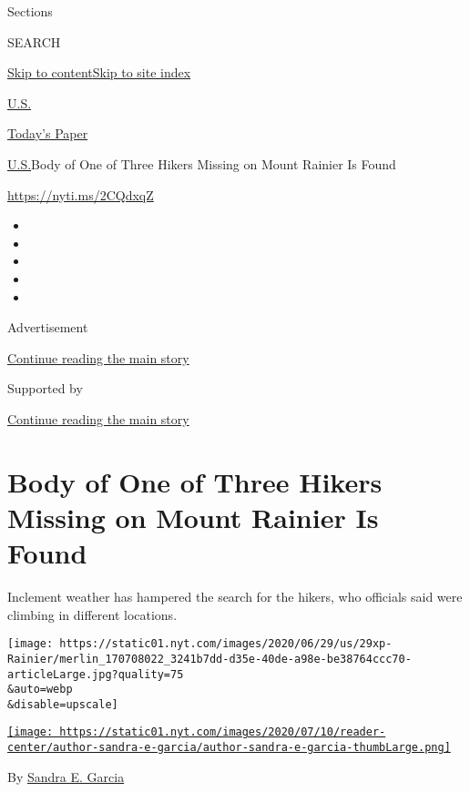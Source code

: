 Sections

SEARCH

\protect\hyperlink{site-content}{Skip to
content}\protect\hyperlink{site-index}{Skip to site index}

\href{https://www.nytimes.com/section/us}{U.S.}

\href{https://myaccount.nytimes.com/auth/login?response_type=cookie\&client_id=vi}{}

\href{https://www.nytimes.com/section/todayspaper}{Today's Paper}

\href{/section/us}{U.S.}\textbar{}Body of One of Three Hikers Missing on
Mount Rainier Is Found

\url{https://nyti.ms/2CQdxqZ}

\begin{itemize}
\item
\item
\item
\item
\item
\end{itemize}

Advertisement

\protect\hyperlink{after-top}{Continue reading the main story}

Supported by

\protect\hyperlink{after-sponsor}{Continue reading the main story}

\hypertarget{body-of-one-of-three-hikers-missing-on-mount-rainier-is-found}{%
\section{Body of One of Three Hikers Missing on Mount Rainier Is
Found}\label{body-of-one-of-three-hikers-missing-on-mount-rainier-is-found}}

Inclement weather has hampered the search for the hikers, who officials
said were climbing in different locations.

\texttt{[image: https://static01.nyt.com/images/2020/06/29/us/29xp-Rainier/merlin\_170708022\_3241b7dd-d35e-40de-a98e-be38764ccc70-articleLarge.jpg?quality=75\\\&auto=webp\\\&disable=upscale]}

\href{https://www.nytimes.com/by/sandra-e-garcia}{\texttt{[image: https://static01.nyt.com/images/2020/07/10/reader-center/author-sandra-e-garcia/author-sandra-e-garcia-thumbLarge.png]}}

By \href{https://www.nytimes.com/by/sandra-e-garcia}{Sandra E. Garcia}

